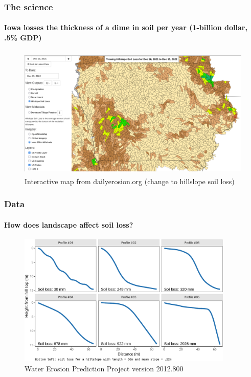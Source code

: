 \documentclass{snedecorbeamer}
\begin{document}
\begin{frame}
  \frametitle{The science}
  \framesubtitle{Iowa losses the thickness of a dime in soil per year (1-billion
    dollar, .5\% GDP)}

  \begin{figure}
    \centering
    \includegraphics[height=17em]{inc/dep_soilloss_map_20221215_168.png}
      \caption*{%
        \href{https://bit.ly/3HZyaRl}{}
        Interactive map from dailyerosion.org (change to hillslope soil loss)}
  \end{figure}
\end{frame}

\begin{frame}
  \frametitle{Data}
  \framesubtitle{How does landscape affect soil loss?}

  \begin{figure}
    \centering
    \includegraphics[height=17em]{inc/wepp_elevation_profiles}
    \caption*{
          \href{https://www.ars.usda.gov/midwest-area/west-lafayette-in/national-soil-erosion-research/docs/wepp/}{}
      Water Erosion Prediction Project version 2012.800
    }
  \end{figure}

\end{frame}
\end{document}

